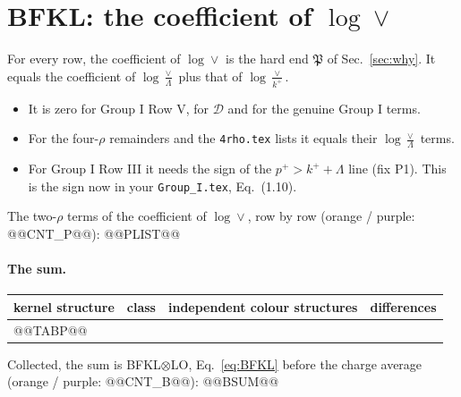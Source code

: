 \documentclass[10pt]{article}
\numberwithin{equation}{section}
\begin{document}
\section{BFKL: the coefficient of $\log\vee$}\label{sec:bfkl}
For every row, the coefficient of $\log\vee$ is the hard end $\mathfrak P$ of Sec.~\ref{sec:why}. It equals the coefficient of $\log\frac{\vee}{\Lambda}$ plus that of $\log\frac{\vee}{k^+}$.
\begin{itemize}
\item It is zero for Group I Row V, for $\mathcal D$ and for the genuine Group I terms.
\item For the four-$\rho$ remainders and the \texttt{4rho.tex} lists it equals their $\log\frac{\vee}{\Lambda}$ terms.
\item For Group I Row III it needs the sign of the $p^+>k^++\Lambda$ line (fix P1). This is the sign now in your \texttt{Group\_I.tex}, Eq.~(1.10).
\end{itemize}
The two-$\rho$ terms of the coefficient of $\log\vee$, row by row (orange / purple: @@CNT_P@@):
@@PLIST@@
\paragraph{The sum.}
\begin{table}[H]\centering\small
\begin{tabular}{@{}llrr@{}}\toprule
kernel structure & class & independent colour structures & differences\\\midrule
@@TABP@@
\bottomrule
\end{tabular}
\end{table}
\noindent Collected, the sum is BFKL$\otimes$LO, Eq.~\eqref{eq:BFKL} before the charge average (orange / purple: @@CNT_B@@):
@@BSUM@@

\end{document}
